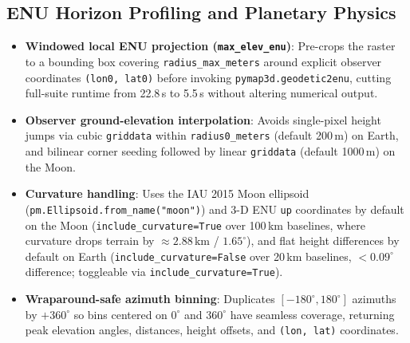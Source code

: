 \documentclass[11pt,letterpaper]{article}
\begin{document}
\subsection{ENU Horizon Profiling and Planetary Physics}
\begin{itemize}
  \item \textbf{Windowed local ENU projection (\texttt{max\_elev\_enu})}: Pre-crops the raster to a bounding box covering \texttt{radius\_max\_meters} around explicit observer coordinates \texttt{(lon0, lat0)} before invoking \texttt{pymap3d.geodetic2enu}, cutting full-suite runtime from 22.8\,s to 5.5\,s without altering numerical output.
  \item \textbf{Observer ground-elevation interpolation}: Avoids single-pixel height jumps via cubic \texttt{griddata} within \texttt{radius0\_meters} (default 200\,m) on Earth, and bilinear corner seeding followed by linear \texttt{griddata} (default 1000\,m) on the Moon.
  \item \textbf{Curvature handling}: Uses the IAU 2015 Moon ellipsoid (\texttt{pm.Ellipsoid.from\_name("moon")}) and 3-D ENU \texttt{up} coordinates by default on the Moon (\texttt{include\_curvature=True} over 100\,km baselines, where curvature drops terrain by $\approx 2.88\,\text{km}$ / $1.65^\circ$), and flat height differences by default on Earth (\texttt{include\_curvature=False} over 20\,km baselines, $< 0.09^\circ$ difference; toggleable via \texttt{include\_curvature=True}).
  \item \textbf{Wraparound-safe azimuth binning}: Duplicates $[{-180}^\circ, 180^\circ]$ azimuths by $+360^\circ$ so bins centered on $0^\circ$ and $360^\circ$ have seamless coverage, returning peak elevation angles, distances, height offsets, and \texttt{(lon, lat)} coordinates.
\end{itemize}
\end{document}

